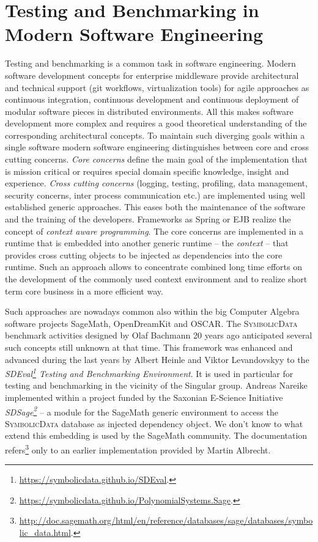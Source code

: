 \documentclass[a4paper,11pt]{article}
\def\SD{\textsc{SymbolicData}}
\begin{document}
\section{Testing and Benchmarking in Modern Software Engineering}

Testing and benchmarking is a common task in software engineering. Modern
software development concepts for enterprise middleware provide architectural
and technical support (git workflows, virtualization tools) for agile
approaches as continuous integration, continuous development and continuous
deployment of modular software pieces in distributed environments.  All this
makes software development more complex and requires a good theoretical
understanding of the corresponding architectural concepts.  To maintain such
diverging goals within a single software modern software engineering
distinguishes between core and cross cutting concerns. \emph{Core concerns}
define the main goal of the implementation that is mission critical or requires
special domain specific knowledge, insight and experience. \emph{Cross cutting
  concerns} (logging, testing, profiling, data management, security concerns,
inter process communication etc.) are implemented using well established generic
approaches.  This eases both the maintenance of the software and the training
of the developers. Frameworks as Spring or EJB realize the concept of
\emph{context aware programming}.  The core concerns are implemented in a
runtime that is embedded into another generic runtime -- the \emph{context} --
that provides cross cutting objects to be injected as dependencies into the
core runtime.  Such an approach allows to concentrate combined long time
efforts on the development of the commonly used context environment and to
realize short term core business in a more efficient way.

Such approaches are nowadays common also within the big Computer Algebra
software projects SageMath, OpenDreamKit and OSCAR. The {\SD} benchmark
activities designed by Olaf Bachmann 20 years ago anticipated several such
concepts still unknown at that time.  This framework was enhanced and advanced
during the last years by Albert Heinle and Viktor Levandovskyy to the
\emph{SDEval\footnote{\url{https://symbolicdata.github.io/SDEval}.}  Testing
  and Benchmarking Environment}.  It is used in particular for testing and
benchmarking in the vicinity of the Singular group.  Andreas Nareike
implemented within a project funded by the Saxonian E-Science Initiative
\emph{SDSage\footnote{\url{https://symbolicdata.github.io/PolynomialSystems.Sage}.}}
-- a module for the SageMath \cite{sagemath} generic environment to access the
{\SD} database as injected dependency object.  We don't know to what extend
this embedding is used by the SageMath community. The documentation
refers\footnote{\url{http://doc.sagemath.org/html/en/reference/databases/sage/databases/symbolic_data.html}.}
only to an earlier implementation provided by Martin Albrecht.
\end{document}
